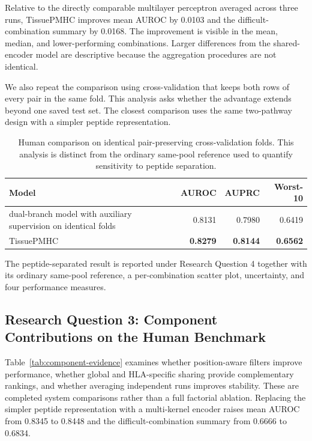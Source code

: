 Relative to the directly comparable multilayer perceptron averaged across three runs, TissuePMHC improves mean AUROC by 0.0103 and the difficult-combination summary by 0.0168. The improvement is visible in the mean, median, and lower-performing combinations. Larger differences from the shared-encoder model are descriptive because the aggregation procedures are not identical.

We also repeat the comparison using cross-validation that keeps both rows of every pair in the same fold. This analysis asks whether the advantage extends beyond one saved test set. The closest comparison uses the same two-pathway design with a simpler peptide representation.

\begin{table}[tbp]
\centering
\caption{Human comparison on identical pair-preserving cross-validation folds. This analysis is distinct from the ordinary same-pool reference used to quantify sensitivity to peptide separation.}
\label{tab:human-matched-oof}
\footnotesize
\begin{tabularx}{\columnwidth}{>{\raggedright\arraybackslash}Xrrr}
\toprule
Model & AUROC & AUPRC & Worst-10 \\ 
\midrule
dual-branch model with auxiliary supervision on identical folds & 0.8131 & 0.7980 & 0.6419 \\ 
TissuePMHC & \textbf{0.8279} & \textbf{0.8144} & \textbf{0.6562} \\ 
\bottomrule
\end{tabularx}
\end{table}

The peptide-separated result is reported under Research Question 4 together with its ordinary same-pool reference, a per-combination scatter plot, uncertainty, and four performance measures.

\subsection{Research Question 3: Component Contributions on the Human Benchmark}

Table~\ref{tab:component-evidence} examines whether position-aware filters improve performance, whether global and HLA-specific sharing provide complementary rankings, and whether averaging independent runs improves stability. These are completed system comparisons rather than a full factorial ablation. Replacing the simpler peptide representation with a multi-kernel encoder raises mean AUROC from 0.8345 to 0.8448 and the difficult-combination summary from 0.6666 to 0.6834.


